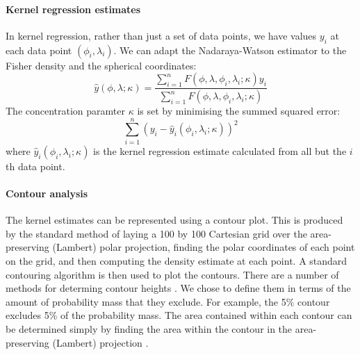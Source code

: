 \documentclass[10pt]{article}
\begin{document}
\paragraph{Kernel regression estimates}
\label{retistruct_plos:sec:kern-regr-estim}

In kernel regression, rather than just a set of data points, we have
values $y_i$ at each data point $(\phi_i, \lambda_i)$. We can adapt
the Nadaraya-Watson estimator \cite{Nada64esti,Watt1964smoo} to the
Fisher density and the spherical coordinates:
\begin{equation}
  \label{kernel-density:eq:4}
    \hat y(\phi,\lambda;\kappa) = \frac{\sum_{i=1}^n F(\phi, \lambda, \phi_i, \lambda_i; \kappa)y_i}{\sum_{i=1}^n F(\phi, \lambda, \phi_i, \lambda_i; \kappa)}
\end{equation}
The concentration paramter $\kappa$ is set by minimising the summed
squared error:
\begin{equation}
  \label{kernel-density:eq:2}
  \sum_{i=1}^n (y_i - \hat y_{i}(\phi_i, \lambda_i;\kappa))^2
\end{equation}
where $\hat y_{i}(\phi_i, \lambda_i;\kappa)$ is the kernel regression
estimate calculated from all but the $i$th data point.


\paragraph{Contour analysis}
\label{retistruct_plos:sec:contouring}

The kernel estimates can be represented using a contour plot. This is
produced by the standard method \cite{FishEtal87spat} of laying a 100
by 100 Cartesian grid over the area-preserving (Lambert) polar
projection, finding the polar coordinates of each point on the grid,
and then computing the density estimate at each point.  A standard
contouring algorithm is then used to plot the contours.  There are a
number of methods for determing contour heights
\cite{FishEtal87spat}. We chose to define them in terms of the amount
of probability mass that they exclude. For example, the 5\% contour
excludes 5\% of the probability mass.  The area contained within each
contour can be determined simply by finding the area within the
contour in the area-preserving (Lambert) projection
\cite{FishEtal87spat}.
\end{document}
